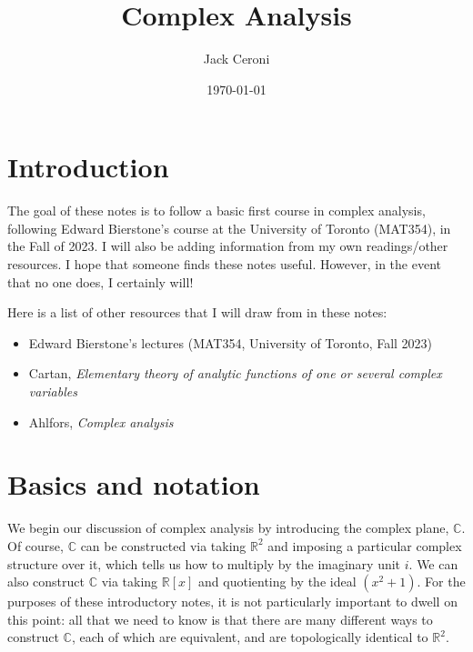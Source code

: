 \documentclass[aps,pra,showpacs,notitlepage,onecolumn,superscriptaddress,nofootinbib]{revtex4-1}
\theoremstyle{definition}
\begin{document}
\title{Complex Analysis}
\author{Jack Ceroni}

\date{\today}

\maketitle

\section{Introduction}

\noindent The goal of these notes is to follow a basic first course in complex analysis, following Edward Bierstone's course at the University of Toronto (MAT354), in the Fall of 2023. I will
also be adding information from my own readings/other resources. I hope that someone finds these notes useful. However, in the event that no one does, I certainly will!

Here is a list of other resources that I will draw from in these notes:

\begin{itemize}
  \item Edward Bierstone's lectures (MAT354, University of Toronto, Fall 2023)
  \item Cartan, \textit{Elementary theory of analytic functions of one or several complex variables}
  \item Ahlfors, \textit{Complex analysis}
  \end{itemize}

\section{Basics and notation}

\noindent We begin our discussion of complex analysis by introducing the complex plane, $\mathbb{C}$. Of course, $\mathbb{C}$ can be constructed via taking $\mathbb{R}^{2}$ and imposing a particular
complex structure over it, which tells us how to multiply by the imaginary unit $i$. We can also construct $\mathbb{C}$ via taking $\mathbb{R}[x]$ and quotienting by the ideal $(x^2 + 1)$.
For the purposes of these introductory notes, it is not particularly important to dwell on this point: all that
we need to know is that there are many different ways to construct $\mathbb{C}$, each of which are equivalent, and are topologically identical to $\mathbb{R}^2$.
\end{document}
